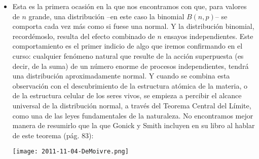 \begin{itemize}
\item Esta es la primera ocasión en la que nos encontramos con que, para valores de $n$ grande, una distribución --en este caso la binomial $B(n,p)$-- se comporta cada vez más como si fuese una normal. Y la distribución binomial, recordémoslo, resulta del efecto combinado de $n$ ensayos independientes. Este comportamiento es el primer indicio de algo que iremos confirmando en el curso: cualquier fenómeno natural que resulte de la acción superpuesta (es decir, de la suma) de un número enorme de procesos independientes, tendrá una distribución aproximadamente normal. Y cuando se combina esta observación con el descubrimiento de la estructura atómica de la materia, o de la estructura celular de los seres vivos, se empieza a percibir el {\sf alcance universal de la distribución normal}, a través del Teorema Central del Límite, como una de las leyes fundamentales de la naturaleza. No encontramos mejor manera de resumirlo que la que Gonick y Smith incluyen en su libro al hablar de este teorema (pág. 83):
   \begin{center}
   \texttt{[image: 2011-11-04-DeMoivre.png]}
   \end{center}




\end{itemize}


%
%
%

